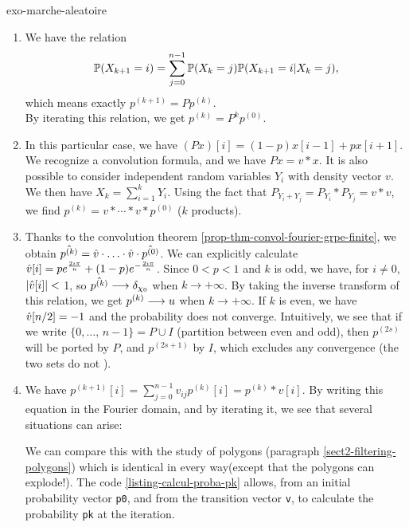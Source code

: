  
\begin{correction}{exo-marche-aleatoire}
\begin{enumerate}
\item We have the relation
\begin{equation*}
\mathbb{P} (X_{k+1} = i) = \sum_{j = 0}^{n-1}{\mathbb{P} (X_k = j) \mathbb{P} (X_{k+1} = i | X_k = j)},
\end{equation*}
which means exactly $ p^{(k+1)} = P p^{(k)} $. \\By iterating this relation, we get $ p^{(k)} = P^kp^{(0)} $.
\item In this particular case, we have $ (P x) [i] = (1-p) x [i-1] + px [i+1] $. We recognize a convolution formula, and we have $ P x = v * x $. It is also possible to consider independent random variables $ Y_i $ with density vector $ v $. We then have $ X_k = \sum_{i = 1}^k{Y_i} $. Using the fact that $ P_{Y_i + Y_j} = P_{Y_i} * P_{Y_j} = v * v $, we find $ p^{(k)} = v * \cdots * v * p^{( 0)} $ ($ k $ products).
\item Thanks to the convolution theorem \ref{prop-thm-convol-fourier-grpe-finite}, we obtain $ \hat{p^{(k)}} = \hat{v} \cdot \ldots \cdot \hat{v} \cdot \hat{p^{(0)}} $. We can explicitly calculate $ \hat{v}[i] = pe^{\frac{2 \imath \pi}{n}} + (1-p) e^{- \frac{2 \imath \pi}{n}} $. Since $ 0 <p <1 $ and $ k $ is odd, we have, for $ i \neq 0 $, $ | \hat{v}[i] | <$ 1, so $ \hat{p^{(k)}} \overset{}{\longrightarrow} \delta_{\chi_0} $ when $ k \to + \infty $. By taking the inverse transform of this relation, we get $ p^{(k)} \overset{}{\longrightarrow} u $ when $ k \to + \infty $. If $ k $ is even, we have $ \hat{v}[n/2] = -1 $ and the probability does not converge. Intuitively, we see that if we write $ \{0, \ldots, \, n-1\} = P \cup I $ (partition between even and odd), then $ p^{(2s)} $ will be ported by $ P $, and $ p^{(2s+1)} $ by $ I $, which excludes any convergence (the two sets do not ).
\item {} We have $ p^{(k+1)}[i] = \sum_{j = 0}^{n-1}{v_{ij} p^{(k)}[i ]} = p^{(k)} * v [i] $. By writing this equation in the Fourier domain, and by iterating it, we see that several situations can arise:   We can compare this with the study of polygons (paragraph \ref{sect2-filtering-polygons}) which is identical in every way(except that the polygons can explode!). The code \Matlab{} \ref{listing-calcul-proba-pk} allows, from an initial probability vector \texttt{\upshape p0}, and from the transition vector \texttt{\upshape v}, to calculate the probability \texttt{\upshape pk} at the  iteration.


\end{enumerate}
\end{correction}

